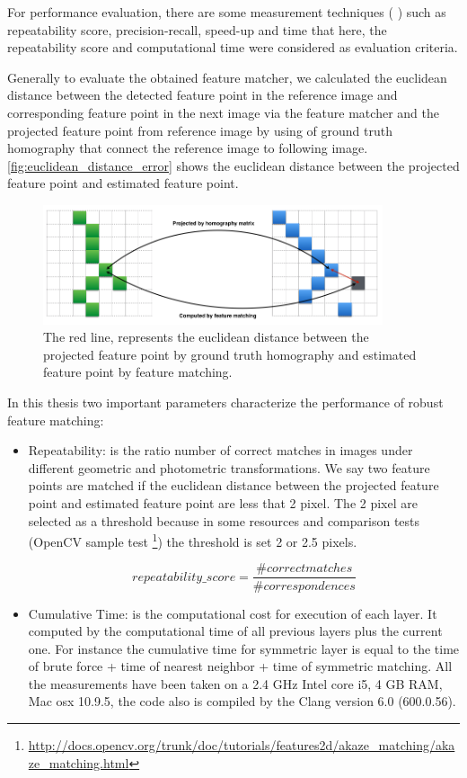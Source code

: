 For performance evaluation, there are some measurement techniques (\cite{mikolajczyk2005comparison} \cite{mikolajczyk2005performance}) such as repeatability score, precision-recall, speed-up and time that here, the repeatability score and computational time were considered as evaluation criteria.

Generally to evaluate the obtained feature matcher, we calculated the euclidean distance between the detected feature point in the reference image and corresponding feature point in the next image via the feature matcher and the projected feature point from reference image by using of ground truth homography that connect the reference image to following image. \autoref{fig:euclidean_distance_error} shows the euclidean distance between the projected feature point and estimated feature point.
\begin{figure}[H]
  \centering
  \includegraphics[width=100mm]{figures/euclidean_distance}
  \caption{The red line, represents the euclidean distance between the projected feature point by ground truth homography and estimated feature point by feature matching. }\label{fig:euclidean_distance_error}
\end{figure}

In this thesis two important parameters characterize the performance of robust feature matching:
\begin{itemize}
  \item Repeatability: is the ratio number of correct matches in images under different geometric and photometric transformations. We say two feature points are matched if the euclidean distance between the projected feature point and estimated feature point are less that 2 pixel. The 2 pixel are selected as a threshold because in some resources and comparison tests (OpenCV sample test \footnote{\url{http://docs.opencv.org/trunk/doc/tutorials/features2d/akaze_matching/akaze_matching.html}}) the threshold is set 2 or 2.5 pixels. 

  $$repeatability\_score = \frac{\# correct matches}{\# correspondences}$$
  \item Cumulative Time: is the computational cost for execution of each layer. It computed by the computational time of all previous layers plus the current one. For instance the cumulative time for symmetric layer is equal to the time of brute force + time of nearest neighbor + time of symmetric matching. All the measurements have been taken on a 2.4 GHz Intel core i5, 4 GB RAM, Mac osx 10.9.5, the code also is compiled by the Clang version 6.0 (600.0.56).
\end{itemize}

